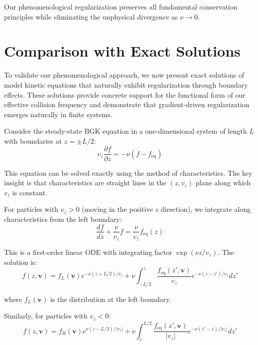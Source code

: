 \documentclass[12pt,a4paper]{article}
\newcommand{\vect}[1]{\mathbf{#1}}
\begin{document}
Our phenomenological regularization preserves all fundamental conservation principles while eliminating the unphysical divergence as $\nu \to 0$.

\section{Comparison with Exact Solutions}

To validate our phenomenological approach, we now present exact solutions of model kinetic equations that naturally exhibit regularization through boundary effects. These solutions provide concrete support for the functional form of our effective collision frequency and demonstrate that gradient-driven regularization emerges naturally in finite systems.

Consider the steady-state BGK equation in a one-dimensional system of length $L$ with boundaries at $z = \pm L/2$:
\begin{equation}
v_z \frac{\partial f}{\partial z} = -\nu(f - f_{\text{eq}})
\label{eq:bgk_1d}
\end{equation}

This equation can be solved exactly using the method of characteristics. The key insight is that characteristics are straight lines in the $(z, v_z)$ plane along which $v_z$ is constant.

For particles with $v_z > 0$ (moving in the positive $z$ direction), we integrate along characteristics from the left boundary:
\begin{equation}
\frac{df}{dz} + \frac{\nu}{v_z}f = \frac{\nu}{v_z}f_{\text{eq}}(z)
\label{eq:characteristic_positive}
\end{equation}

This is a first-order linear ODE with integrating factor $\exp(\nu z/v_z)$. The solution is:
\begin{equation}
f(z, \vect{v}) = f_L(\vect{v})e^{-\nu(z+L/2)/v_z} + \nu \int_{-L/2}^{z} \frac{f_{\text{eq}}(z', \vect{v})}{v_z} e^{-\nu(z-z')/v_z} dz'
\label{eq:char_pos}
\end{equation}

where $f_L(\vect{v})$ is the distribution at the left boundary.

Similarly, for particles with $v_z < 0$:
\begin{equation}
f(z, \vect{v}) = f_R(\vect{v})e^{\nu(z-L/2)/|v_z|} + \nu \int_{z}^{L/2} \frac{f_{\text{eq}}(z', \vect{v})}{|v_z|} e^{-\nu(z'-z)/|v_z|} dz'
\label{eq:char_neg}
\end{equation}
\end{document}
